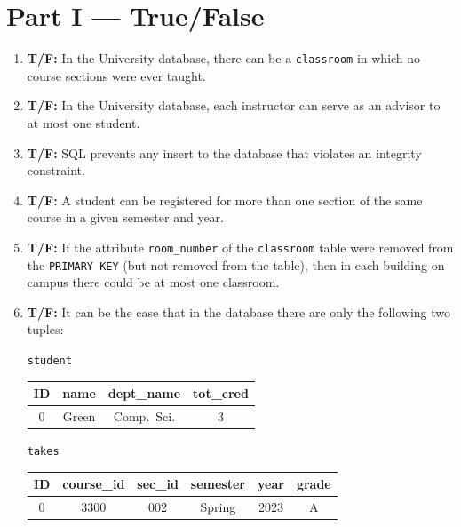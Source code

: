 \documentclass{article}
\begin{document}
\section*{Part I — True/False}
\begin{enumerate}
  \item \textbf{T/F:} In the University database, there can be a \texttt{classroom} in which no course sections were ever taught.
  \item \textbf{T/F:} In the University database, each instructor can serve as an advisor to at most one student.
  \item \textbf{T/F:} SQL prevents any insert to the database that violates an integrity constraint.
  \item \textbf{T/F:} A student can be registered for more than one section of the same course in a given semester and year.
  \item \textbf{T/F:} If the attribute \texttt{room\_number} of the \texttt{classroom} table were removed from the \texttt{PRIMARY KEY} (but not removed from the table), then in each building on campus there could be at most one classroom.
  \item \textbf{T/F:} It can be the case that in the database there are only the following two tuples:

  \medskip
  \noindent\texttt{student}
  \begin{center}
  \begin{tabular}{|c|c|c|c|}
  \hline
  \textbf{ID} & \textbf{name} & \textbf{dept\_name} & \textbf{tot\_cred} \\\hline
  0 & Green & Comp.\ Sci. & 3 \\\hline
  \end{tabular}
  \end{center}

  \noindent\texttt{takes}
  \begin{center}
  \begin{tabular}{|c|c|c|c|c|c|}
  \hline
  \textbf{ID} & \textbf{course\_id} & \textbf{sec\_id} & \textbf{semester} & \textbf{year} & \textbf{grade} \\\hline
  0 & 3300 & 002 & Spring & 2023 & A \\\hline
  \end{tabular}
  \end{center}


\end{enumerate}
\end{document}

